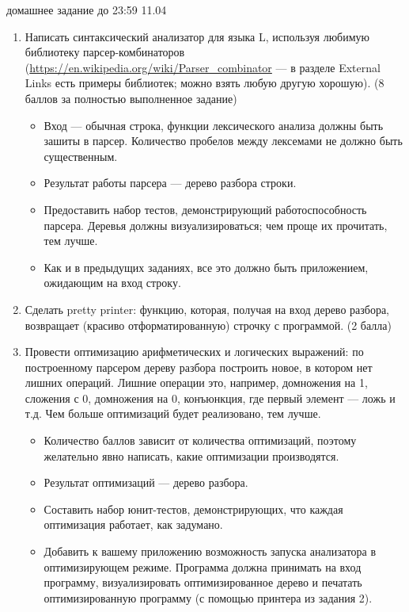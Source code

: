 \documentclass[12pt]{article}
\begin{document}

{\Large домашнее задание до 23:59 11.04}
\bigskip

\begin{enumerate}
  \item 
  {  Написать синтаксический анализатор для языка L, используя любимую библиотеку парсер-комбинаторов (\url{https://en.wikipedia.org/wiki/Parser_combinator} --- в разделе External Links есть примеры библиотек; можно взять любую другую хорошую). (8 баллов за полностью выполненное задание) 
  \begin{itemize}
    \item Вход --- обычная строка, функции лексического анализа должны быть зашиты в парсер. Количество пробелов между лексемами не должно быть существенным. 
    \item Результат работы парсера --- дерево разбора строки. 
    \item Предоставить набор тестов, демонстрирующий работоспособность парсера. Деревья должны визуализироваться; чем проще их прочитать, тем лучше.
    \item Как и в предыдущих заданиях, все это должно быть приложением, ожидающим на вход строку.
  \end{itemize}
  }
  \item
  {
    Сделать pretty printer: функцию, которая, получая на вход дерево разбора, возвращает (красиво отформатированную) строчку с программой. (2 балла)
  }
  \item 
  {
    Провести оптимизацию арифметических и логических выражений: по построенному парсером дереву разбора построить новое, в котором нет лишних операций. Лишние операции это, например, домножения на 1, сложения с 0, домножения на 0, конъюнкция, где первый элемент --- ложь и т.д. Чем больше оптимизаций будет реализовано, тем лучше. 
    \begin{itemize}
      \item Количество баллов зависит от количества оптимизаций, поэтому желательно явно написать, какие оптимизации производятся.
      \item Результат оптимизаций --- дерево разбора. 
      \item Составить набор юнит-тестов, демонстрирующих, что каждая оптимизация работает, как задумано. 
      \item Добавить к вашему приложению возможность запуска анализатора в оптимизирующем режиме. Программа должна принимать на вход программу, визуализировать оптимизированное дерево и печатать оптимизированную программу (с помощью принтера из задания 2).
    \end{itemize}
  }
\end{enumerate}

\end{document}
